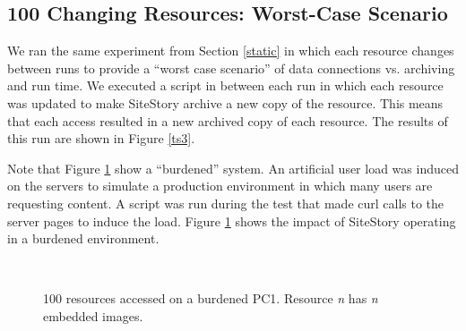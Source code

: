 \documentclass[runningheads,a4paper]{llncs}
\begin{document}
\subsection{100 Changing Resources: Worst-Case Scenario}
\label{changes}
\vskip -3mm
We ran the same experiment from Section \ref{static} in which each resource changes between runs to provide a ``worst case scenario'' of data connections vs. archiving and run time. We executed a script in between each run in which each resource was updated to make SiteStory archive a new copy of the resource. This means that each access resulted in a new archived copy of each resource. The results of this run are shown in Figure \ref{ts3}. 


Note that Figure \ref{pc1002} show a  ``burdened'' system. An artificial user load was induced on the servers to simulate a production environment in which many users are requesting content. A script was run during the test that made curl calls to the server pages to induce the load. Figure \ref{pc1002} shows the impact of SiteStory operating in a burdened environment. 


\begin{figure}[ht!]
  \begin{center}
     \\
  \end{center}
  \caption{100 resources accessed on a burdened PC1. Resource \emph{n} has \emph{n} embedded images.}
  \label{pc1002}
\end{figure}
\end{document}
